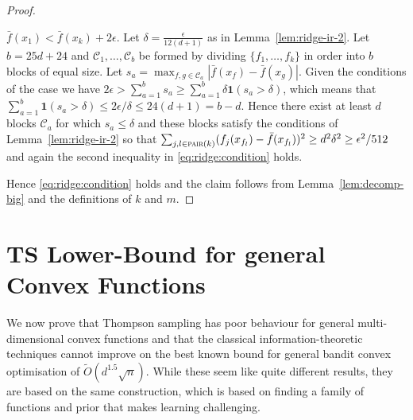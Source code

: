 \documentclass[letter, 12pt]{report}
\newcommand{\pair}{\operatorname{\textsc{pair}}}
\newcommand{\cC}{\mathcal C}
\newcommand{\sind}{\bm{1}}
\newcommand{\1}{\mathbf{1}}
\newcommand{\ts}{\textsc{TS}\xspace}
\theoremstyle{plain}
\theoremstyle{definition}
\theoremstyle{remark}
\begin{document}
\begin{proof}
\begin{enumcases}
        \item $\bar f(x_1) < \bar f(x_k) + 2\epsilon$. Let $\delta = \frac{\epsilon}{12(d+1)}$ as in Lemma~\ref{lem:ridge-ir-2}.
        Let $b = 25d + 24$ and $\cC_1,\ldots,\cC_b$ be formed by dividing $\{f_1,\ldots,f_k\}$ in order into $b$ blocks of equal size.
        Let $s_a = \max_{f,g \in \cC_a} |\bar f(x_f) - \bar f(x_g)|$.
        Given the conditions of the case we have $2\epsilon > \sum_{a=1}^b s_a \geq \sum_{a=1}^b \delta \sind(s_a > \delta)$,
        which means that $\sum_{a=1}^b \sind(s_a > \delta) \leq 2\epsilon / \delta \leq 24(d+1) = b - d$.
        Hence there exist at least $d$ blocks $\cC_a$ for which $s_a \leq \delta$ and these blocks satisfy the conditions of Lemma~\ref{lem:ridge-ir-2} so that
        $\sum_{j,l \in \pair(k)} (f_j(x_{f_l}) - \bar f(x_{f_l}))^2 \geq d^2 \delta^2 \geq \epsilon^2 / 512$ and again the
        second inequality in \cref{eq:ridge:condition} holds.
    \end{enumcases}
    Hence \cref{eq:ridge:condition} holds and the claim follows from Lemma~\ref{lem:decomp-big} and the definitions of $k$ and $m$.
\end{proof}

\chapter{\ts Lower-Bound for general Convex Functions}
We now prove that
Thompson sampling has poor behaviour for general multi-dimensional convex functions and
that the classical information-theoretic techniques cannot improve on the best known bound for general bandit convex optimisation
of $\tilde O(d^{1.5} \sqrt{n})$. While these seem like quite different results, they are based on the same construction, which is
based on finding a family of functions and prior that makes learning challenging.
\end{document}
